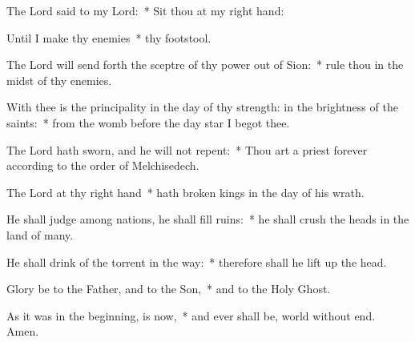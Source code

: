 \begin{enpars}
\item The Lord said to my Lord:~* Sit thou at my right hand:
\item Until I make thy enemies~* thy footstool.
\item The Lord will send forth the sceptre of thy power out of Sion:~* rule thou in the midst of thy enemies.
\item With thee is the principality in the day of thy strength: in the brightness of the saints:~* from the womb before the day star I begot thee.
\item The Lord hath sworn, and he will not repent:~* Thou art a priest forever according to the order of Melchisedech.
\item The Lord at thy right hand~* hath broken kings in the day of his wrath.
\item He shall judge among nations, he shall fill ruins:~* he shall crush the heads in the land of many.
\item He shall drink of the torrent in the way:~* therefore shall he lift up the head.
\item Glory be to the Father, and to the Son,~* and to the Holy Ghost. 
\item As it was in the beginning, is now,~* and ever shall be, world without end. Amen.
\end{enpars}
